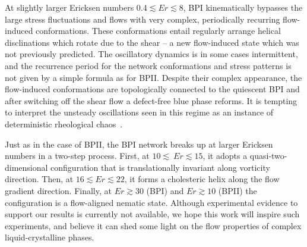\documentclass[8.5pt,twoside,twocolumn]{article}
\begin{document}
At slightly larger Ericksen numbers $0.4\lesssim Er \lesssim8$,
BPI kinematically bypasses the large stress fluctuations and 
flows with very complex, periodically recurring flow-induced conformations.
These conformations entail regularly arrange helical disclinations which 
rotate due to the shear -- a new flow-induced state which was not previously
predicted. 
The oscillatory dynamics is in some cases intermittent, and the
recurrence period for the network conformations and stress patterns
is not given by a simple formula as for BPII.
Despite their complex appearance, the flow-induced conformations are 
topologically connected to the quiescent BPI and after switching off the 
shear flow a defect-free blue phase reforms. It is tempting to
interpret the unsteady oscillations seen in this regime as an instance of 
deterministic rheological chaos~\cite{fielding, Cates:2002}.

Just as in the case of BPII, the BPI network breaks up at larger Ericksen numbers in
a two-step process. First, at $10\lesssim\ Er\lesssim 15$, it adopts a 
quasi-two-dimensional configuration that is translationally invariant along vorticity direction. 
Then, at $16\lesssim Er \lesssim 22$, it forms a cholesteric helix along the flow gradient 
direction.  Finally, at $Er\gtrsim30$ (BPI) and $Er\gtrsim10$ (BPII) the configuration
is a flow-aligned nematic state.
Although experimental evidence to support
our results is currently not available, we hope this work will inspire such experiments, and believe it can shed some light 
on the flow properties of complex liquid-crystalline phases.


%
\end{document}

